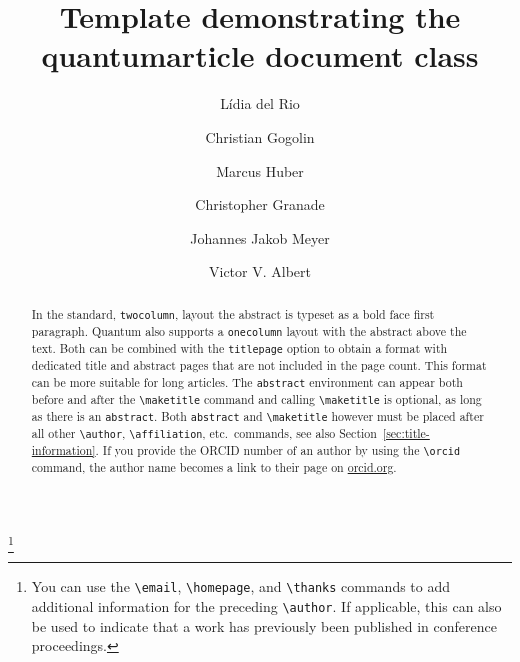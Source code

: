 \documentclass[a4paper,twocolumn,11pt,accepted=2017-05-09]{quantumarticle}
\begin{document}
\title{Template demonstrating the quantumarticle document class}

\author{Lídia del Rio}
\author{Christian Gogolin}
\thanks{You can use the \texttt{\textbackslash{}email}, \texttt{\textbackslash{}homepage}, and \texttt{\textbackslash{}thanks} commands to add additional information for the preceding \texttt{\textbackslash{}author}. If applicable, this can also be used to indicate that a work has previously been published in conference proceedings.}
\author{Marcus Huber}
\author{Christopher Granade}
\author{Johannes Jakob Meyer}
\author{Victor V. Albert}
\maketitle

\begin{abstract}
  In the standard, \texttt{twocolumn}, layout the abstract is typeset as a bold face first paragraph.
  Quantum also supports a \texttt{onecolumn} layout with the abstract above the text.
  Both can be combined with the \texttt{titlepage} option to obtain a format with dedicated title and abstract pages that are not included in the page count.
  This format can be more suitable for long articles.
  The \texttt{abstract} environment can appear both before and after the \texttt{\textbackslash{}maketitle} command and calling \texttt{\textbackslash{}maketitle} is optional, as long as there is an \texttt{abstract}.
  Both \texttt{abstract} and \texttt{\textbackslash{}maketitle} however must be placed after all other \texttt{\textbackslash{}author}, \texttt{\textbackslash{}affiliation}, etc.\ commands, see also Section~\ref{sec:title-information}.
  If you provide the ORCID number of an author by using the \texttt{\textbackslash{}orcid} command, the author name becomes a link to their page on \href{http://orcid.org/}{orcid.org}.
\end{abstract}
\end{document}
